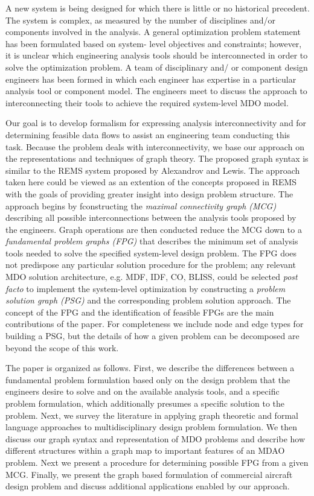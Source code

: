     A new system is being designed for which there is little or no historical precedent. The system
    is complex, as measured by the number of disciplines and/or components involved in the
    analysis. A general optimization problem statement has been formulated based on system-
    level objectives and constraints; however, it is unclear which engineering analysis tools should
    be interconnected in order to solve the optimization problem. A team of disciplinary and/
    or component design engineers has been formed in which each engineer has expertise in a
    particular analysis tool or component model. The engineers meet to discuss the approach to
    interconnecting their tools to achieve the required system-level MDO model.
    
    Our goal is to develop formalism for expressing analysis interconnectivity and for determining feasible
    data flows to assist an engineering team conducting this task. Because the problem deals with
    interconnectivity, we base our approach on the representations and techniques of graph theory. The 
    proposed graph syntax is similar to the REMS system proposed by 
    Alexandrov and Lewis\cite{alexandrov2004}. The approach taken here could be viewed as an extention 
    of the concepts proposed in REMS with the goals of providing greater insight into design problem 
    structure.  The approach begins by fconstructing the \emph{maximal connectivity graph (MCG)} describing all possible
    interconnections between the analysis tools proposed by the engineers. Graph operations are then
    conducted reduce the MCG down to a \emph{fundamental problem graphs (FPG)} that describes the minimum set of analysis
    tools needed to solve the specified system-level design problem. The FPG does not predispose
    any particular solution procedure for the problem; any relevant MDO solution architecture, e.g. MDF,
    IDF, CO, BLISS, could be selected \emph{post facto} to implement the system-level optimization by
    constructing a \emph{problem solution graph (PSG)} and the corresponding problem solution approach.
    The concept of the FPG and the identification of feasible FPGs are the main contributions of the paper.
    For completeness we include node and edge types for building a PSG, but the details of how a given 
    problem can be decomposed are beyond the scope of this work. 

    The paper is organized as follows. First, we describe the differences between 
    a fundamental problem formulation based only on the design problem
    that the engineers desire to solve and on the available analysis tools, 
    and a specific problem formulation, which additionally 
    presumes a specific solution to the problem. Next, we survey the literature in applying
    graph theoretic and formal language approaches to multidisciplinary design 
    problem formulation. We then discuss our graph syntax and representation of 
    MDO problems and describe how different structures within a graph map to important
    features of an MDAO problem. Next we present a procedure for determining possible 
    FPG from a given MCG. Finally, we present the graph based formulation of commercial 
    aircraft design problem and discuss additional applications enabled by our approach.



